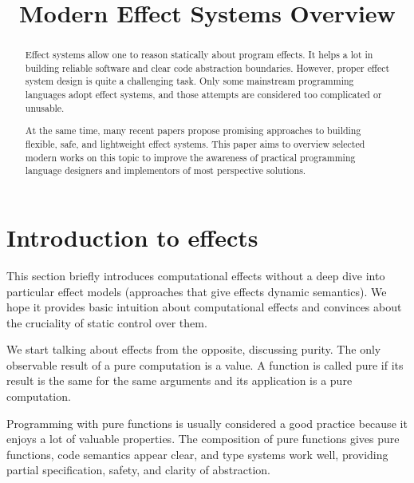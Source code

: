 \documentclass[conference]{IEEEtran}
\begin{document}
    \title{Modern Effect Systems Overview
    }

    \author{
    }

    \maketitle


    \begin{abstract}
        Effect systems allow one to reason statically about program effects.
        It helps a lot in building reliable software and clear code abstraction boundaries.
        However, proper effect system design is quite a challenging task.
        Only some mainstream programming languages adopt effect systems, and those attempts are considered too complicated or unusable.

        At the same time, many recent papers propose promising approaches to building flexible, safe, and lightweight effect systems.
        This paper aims to overview selected modern works on this topic to improve the awareness of practical programming language designers and implementors of most perspective solutions.
    \end{abstract}


    \section{Introduction to effects}

    This section briefly introduces computational effects without a deep dive into particular effect models (approaches that give effects dynamic semantics).
    We hope it provides basic intuition about computational effects and convinces about the cruciality of static control over them.

    We start talking about effects from the opposite, discussing purity.
    The only observable result of a pure computation is a value.
    A function is called pure if its result is the same for the same arguments and its application is a pure computation.

    Programming with pure functions is usually considered a good practice because it enjoys a lot of valuable properties.
    The composition of pure functions gives pure functions, code semantics appear clear, and type systems work well, providing partial specification, safety, and clarity of abstraction.
\end{document}
